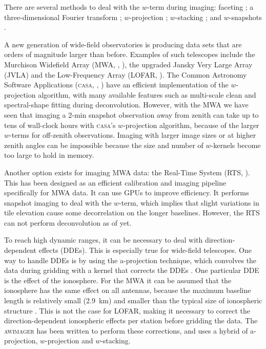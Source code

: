 \documentclass[useAMS,usenatbib]{mn2e}
\begin{document}
There are several methods to deal with the $w$-term during imaging: faceting \citep{facetting-cornwell}; a three-dimensional Fourier transform \citep{perley-noncoplanar-arrays}; $w$-projection \citep{wprojection-cornwell}; $w$-stacking \citep{ska-memo-regridding-2011}; and $w$-snapshots \citep{widefield-imaging-ska-cornwell}.

A new generation of wide-field observatories is producing data sets that are orders of magnitude larger than before. Examples of such telescopes include the Murchison Widefield Array (MWA, \citealt{mwa-design-2009}, \citealt{mwa}), the upgraded Jansky Very Large Array (JVLA) and the Low-Frequency Array (LOFAR, \citealt{lofar-2013}). The Common Astronomy Software Applications (\textsc{casa}, \citealt{casa-2007}, \citealt{casa-2008}) have an efficient implementation of the $w$-projection algorithm, with many available features such as multi-scale clean and spectral-shape fitting during deconvolution. However, with the MWA we have seen that imaging a 2-min snapshot observation away from zenith can take up to tens of wall-clock hours with \textsc{casa}'s $w$-projection algorithm, because of the larger $w$-terms for off-zenith observations. Imaging with larger image sizes or at higher zenith angles can be impossible because the size and number of $w$-kernels become too large to hold in memory.

Another option exists for imaging MWA data: the Real-Time System (RTS, \citealt{rts-mwa,mwa-interferometric-imaging}). This has been designed as an efficient calibration and imaging pipeline specifically for MWA data. It can use GPUs to improve efficiency. It performs snapshot imaging to deal with the $w$-term, which implies that slight variations in tile elevation cause some decorrelation on the longer baselines. However, the RTS can not perform deconvolution as of yet.

To reach high dynamic ranges, it can be necessary to deal with direction-dependent effects (DDEs). This is especially true for wide-field telescopes. One way to handle DDEs is by using the a-projection technique, which convolves the data during gridding with a kernel that corrects the DDEs \citep{aprojection-2008}.
One particular DDE is the effect of the ionosphere. For the MWA it can be assumed that the ionosphere has the same effect on all antennas, because the maximum baseline length is relatively small (2.9~km) and smaller than the typical size of ionospheric structure \citep{lonsdale-calibration-approaches-ionosphere}. This is not the case for LOFAR, making it necessary to correct the direction-dependent ionospheric effects per station before gridding the data. The \textsc{awimager} \citep{awimager-2013} has been written to perform these corrections, and uses a hybrid of a-projection, $w$-projection and $w$-stacking.
\end{document}
